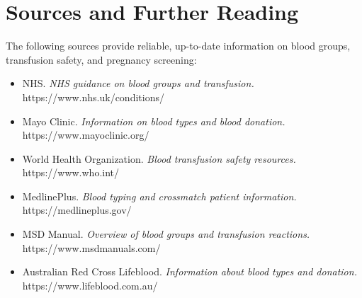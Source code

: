 \section*{Sources and Further Reading}
The following sources provide reliable, up-to-date information on blood groups, transfusion safety, and pregnancy screening:

\begin{itemize}
    \item NHS. \textit{NHS guidance on blood groups and transfusion.} https://www.nhs.uk/conditions/
    \item Mayo Clinic. \textit{Information on blood types and blood donation.} https://www.mayoclinic.org/
    \item World Health Organization. \textit{Blood transfusion safety resources.} https://www.who.int/
    \item MedlinePlus. \textit{Blood typing and crossmatch patient information.} https://medlineplus.gov/
    \item MSD Manual. \textit{Overview of blood groups and transfusion reactions.} https://www.msdmanuals.com/
    \item Australian Red Cross Lifeblood. \textit{Information about blood types and donation.} https://www.lifeblood.com.au/
\end{itemize}
